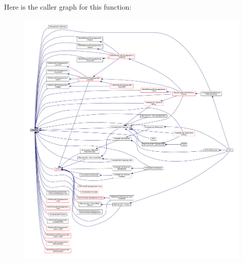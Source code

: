 Here is the caller graph for this function\-:\nopagebreak
\begin{figure}[H]
\begin{center}
\leavevmode
\includegraphics[width=350pt]{rnd_2randomc_8h_a286fff8437e15b1a6ba210f84af9fce0_icgraph}
\end{center}
\end{figure}


